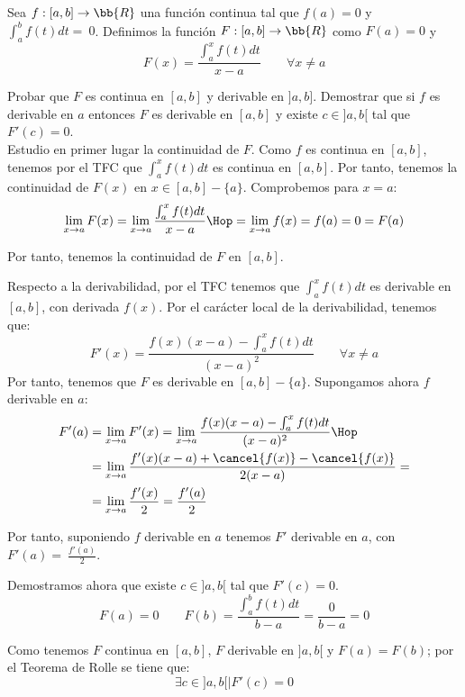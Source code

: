 \begin{ejercicio}
    Sea $f:[a,b]\to \bb{R}$ una función continua tal que $f(a)=0$ y $\int_a^bf(t)dt=~0$. Definimos la función $F:[a,b]\to\bb{R}$ como $F(a)=0$ y 
    \begin{equation*}
        F(x) = \frac{\int_a^x f(t)dt}{x-a} \qquad \forall x\neq a
    \end{equation*}

    Probar que $F$ es continua en $[a,b]$ y derivable en $]a,b]$. Demostrar que si $f$ es derivable en $a$ entonces $F$ es derivable en $[a,b]$ y existe $c\in]a,b[$ tal que $F'(c)=0$.\\

    Estudio en primer lugar la continuidad de $F$. Como $f$ es continua en $[a,b]$, tenemos por el TFC que $\int_a^x f(t)dt$ es continua en $[a,b]$. Por tanto, tenemos la continuidad de $F(x)$ en $x\in [a,b]-\{a\}$. Comprobemos para $x=a$:
    \begin{equation*}
        \lim_{x\to a}F(x) = \lim_{x\to a}\frac{\int_a^x f(t)dt}{x-a} \Hop = \lim_{x\to a}f(x) = f(a) = 0 = F(a)
    \end{equation*}

    Por tanto, tenemos la continuidad de $F$ en $[a,b]$.
    
    \vspace{1cm}Respecto a la derivabilidad, por el TFC tenemos que $\int_a^x f(t)dt$ es derivable en $[a,b]$, con derivada $f(x)$. Por el carácter local de la derivabilidad, tenemos que:
    \begin{equation*}
        F'(x)=\frac{f(x)(x-a)-\int_a^xf(t)dt}{(x-a)^2} \qquad \forall x\neq a
    \end{equation*}
    Por tanto, tenemos que $F$ es derivable en $[a,b]-\{a\}$. Supongamos ahora $f$ derivable en $a$:
    \begin{equation*}\begin{split}
        F'(a)&=\lim_{x\to a}F'(x) = \lim_{x\to a}\frac{f(x)(x-a)-\int_a^xf(t)dt}{(x-a)^2}
        \Hop
        \\&= \lim_{x\to a}\frac{f'(x)(x-a) + \cancel{f(x)}-\cancel{f(x)}}{2(x-a)} =
        \\&= \lim_{x\to a}\frac{f'(x)}{2} = \frac{f'(a)}{2}
    \end{split}\end{equation*}

    Por tanto, suponiendo $f$ derivable en $a$ tenemos $F'$ derivable en $a$, con $F'(a)=~\frac{f'(a)}{2}$.

    \vspace{1cm}Demostramos ahora que existe $c\in]a,b[$ tal que $F'(c)=0$.
    \begin{equation*}
        F(a)=0 \qquad F(b)=\frac{\int_a^b f(t)dt}{b-a} = \frac{0}{b-a} = 0
    \end{equation*}

    Como tenemos $F$ continua en $[a,b]$, $F$ derivable en $]a,b[$ y $F(a)=F(b)$; por el Teorema de Rolle se tiene que:
    \begin{equation*}
        \exists c\in ]a,b[ \mid F'(c)=0
    \end{equation*}
\end{ejercicio}

